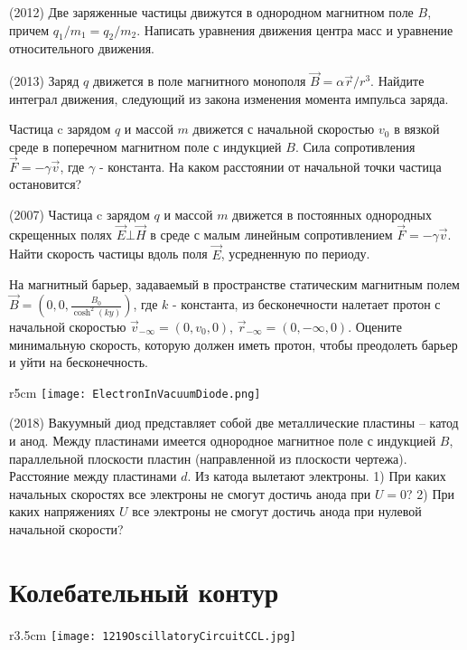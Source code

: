\AddProb (2012) Две заряженные частицы движутся в однородном магнитном поле $B$, причем $q_1/m_1 = q_2/m_2$. Написать уравнения движения центра масс и уравнение относительного движения.

\AddProb (2013) Заряд $q$ движется в поле магнитного монополя $\vec{B} = \alpha \vec{r}/r^3$. Найдите интеграл движения, следующий из закона изменения момента импульса заряда.

\AddProb Частица c зарядом $q$ и массой $m$ движется с начальной скоростью $v_0$ в вязкой среде в поперечном магнитном поле с индукцией $B$. Сила сопротивления $\vec{F} = -\gamma \vec{v}$, где $\gamma$ - константа. На каком расстоянии от начальной точки частица остановится?

\AddProb (2007) Частица c зарядом $q$ и массой $m$ движется в постоянных однородных скрещенных полях $\vec{E} \bot \vec{H}$ в среде с малым линейным сопротивлением $\vec{F} = -\gamma \vec{v}$. Найти скорость частицы вдоль поля $\vec{E}$, усредненную по периоду.

\AddProb На магнитный барьер, задаваемый в пространстве статическим магнитным полем $\vec{B} = \left(0, 0, \frac{B_0}{\cosh^2(ky)}\right)$, где $k$ - константа, из бесконечности налетает протон с начальной скоростью $\vec{v}_{-\infty} = (0, v_0, 0)$, $\vec{r}_{-\infty} = (0, -\infty, 0)$. Оцените минимальную скорость, которую должен иметь протон, чтобы преодолеть барьер и уйти на бесконечность. 

\begin{wrapfigure}{r}{5cm}
\texttt{[image: ElectronInVacuumDiode.png]}
\end{wrapfigure}
\AddProb (2018) Вакуумный диод представляет собой две металлические пластины -- катод и анод. Между пластинами имеется однородное магнитное поле с индукцией $B$, параллельной плоскости пластин (направленной из плоскости чертежа). Расстояние между пластинами $d$. Из катода вылетают электроны. 1) При каких начальных скоростях все электроны не смогут достичь анода при $U = 0$? 2) При каких напряжениях $U$ все электроны не смогут достичь анода при нулевой начальной скорости?

\section{Колебательный контур}

\begin{wrapfigure}{r}{3.5cm}
\texttt{[image: 1219OscillatoryCircuitCCL.jpg]}
\end{wrapfigure}

